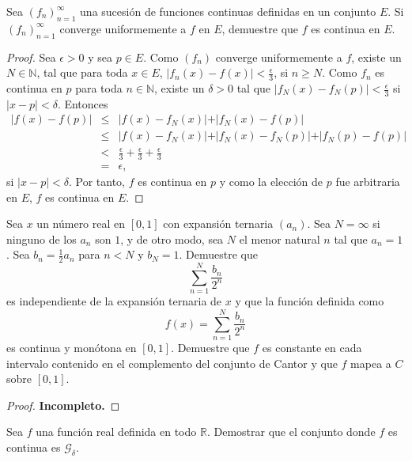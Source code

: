 \documentclass[12pt]{article}
\newcommand{\N}{\mathbb{N}}
\newcommand{\R}{\mathbb{R}}
\newenvironment{problem}[2][Problema]{\begin{trivlist}
\item[\hskip \labelsep {\bfseries #1}\hskip \labelsep {\bfseries #2.}]}{\end{trivlist}}
\begin{document}
\begin{problem}{41} Sea $(f_n)_{n=1}^\infty$ una sucesión de funciones continuas definidas en un conjunto $E$. Si $(f_n)_{n=1}^\infty$ converge uniformemente a $f$ en $E$, demuestre que $f$ es continua en $E$.
 
\end{problem}

\begin{proof}
Sea $\epsilon > 0$ y sea $p \in E$. Como $(f_n)$ converge uniformemente a $f$, existe un $N \in \N$, tal que para toda $x \in E$, $\lvert f_n(x) - f(x) \lvert < \frac{\epsilon}{3}$, si $n \geq N$. Como $f_n$ es continua en $p$ para toda $n \in \N$, existe un $\delta > 0$ tal que $\lvert f_N(x) - f_N(p) \lvert < \frac{\epsilon}{3}$ si $\lvert x - p \lvert < \delta$. Entonces 
\begin{eqnarray*}
\lvert f(x) - f(p) \lvert &\leq& \lvert f(x) - f_N(x) \lvert + \lvert f_N(x) - f(p) \lvert\\
&\leq& \lvert f(x) - f_N(x) \lvert + \lvert f_N(x) - f_N(p) \lvert + \lvert f_N(p) - f(p) \lvert \\
& < & \frac{\epsilon}{3} + \frac{\epsilon}{3} + \frac{\epsilon}{3}\\
&=& \epsilon,
\end{eqnarray*}
si $\lvert x - p \lvert < \delta.$ Por tanto, $f$ es continua en $p$ y como la elección de $p$ fue arbitraria en $E$, $f$ es continua en $E.$
\end{proof}

\begin{problem}{46}
Sea $x$ un número real en $[0, 1]$ con expansión ternaria $(a_n).$ Sea $N=\infty$ si ninguno de los $a_n$ son $1$, y de otro modo, sea $N$ el menor natural $n$ tal que $a_n = 1$. Sea $b_n = \frac{1}{2}a_n$ para $n < N$ y $b_N = 1.$ Demuestre que 
$$ \sum_{n=1}^N \frac{b_n}{2^n} $$
es independiente de la expansión ternaria de $x$ y que la función definida como 
$$f(x) =  \sum_{n=1}^N \frac{b_n}{2^n}$$
es continua y monótona en $[0, 1]$. Demuestre que $f$ es constante en cada intervalo contenido en el complemento del conjunto de Cantor y que $f$ mapea a $C$ sobre $[0, 1]$. 

\end{problem}

\begin{proof}
\textbf{Incompleto.}
\end{proof}

\begin{problem}{51} Sea $f$ una función real definida en todo $\R$. Demostrar que el conjunto donde $f$ es continua es $\mathcal{G}_\delta$. 
\end{problem}
\end{document}
